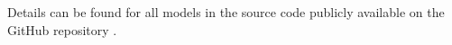 Details can be found for all models in the source code publicly available on the GitHub repository .





